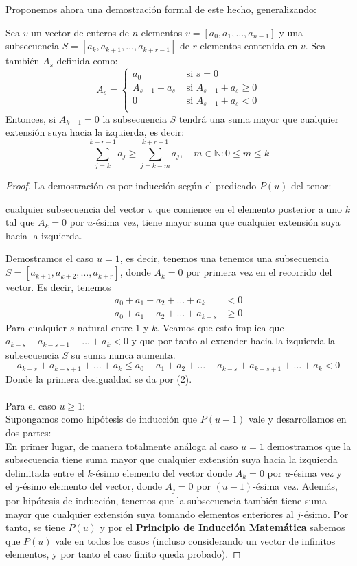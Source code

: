 \documentclass{article}
\begin{document}
Proponemos ahora una demostración formal de este hecho, generalizando:

\begin{teo}
Sea $v$ un vector de enteros de $n$ elementos $v = [a_{0}, a_{1}, \ldots, a_{n-1}]$ y una subsecuencia $S = [a_{k}, a_{k+1}, \ldots, a_{k+r-1}]$ de $r$ elementos contenida en $v$. Sea también $A_{s}$ definida como:
\[
A_{s} = 
\begin{cases}
a_{0} &\text{ si } s = 0 \\
A_{s-1} + a_{s} &\text{ si } A_{s-1} + a_{s} \ge 0 \\
0 &\text{ si } A_{s-1} + a_{s} < 0 \\
\end{cases} 
\]
Entonces, si $A_{k-1} = 0$ la subsecuencia $S$ tendrá una suma mayor que cualquier extensión suya hacia la izquierda, es decir:
\[
\sum_{j=k}^{k+r-1} a_{j} \ge \sum_{j=k-m}^{k+r-1} a_{j}, \quad m \in \mathbb{N} : 0 \le m \le k
\] 

\begin{proof}
La demostración es por inducción según el predicado $P(u)$ del tenor:
\begin{center}
    cualquier subsecuencia del vector $v$ que comience en el elemento
    posterior a uno $k$ tal que $A_k = 0$ por $u$-ésima vez, tiene
    mayor suma que cualquier extensión suya hacia la izquierda.
\end{center}
Demostramos el caso $u = 1$, es decir, tenemos una tenemos una subsecuencia $S = [a_{k+1}, a_{k+2}, \ldots, a_{k+r}]$, donde $A_{k} = 0$ por primera vez en el recorrido del vector.
Es decir, tenemos
\begin{align}
a_{0} + a_{1} + a_{2} + \ldots + a_{k} &< 0 \\
a_{0} + a_{1} + a_{2} + \ldots + a_{k-s} & \geq 0 
\end{align}
Para cualquier $s$ natural entre $1$ y $k$. Veamos que esto
implica que $a_{k-s} + a_{k-s+1} + \ldots + a_{k} < 0$ y que por tanto al extender hacia la izquierda la subsecuencia $S$ su suma 
nunca aumenta.
\[
a_{k-s} + a_{k-s+1} + \ldots + a_{k} \le  a_{0} + a_{1} + a_{2} + \ldots + a_{k-s} + a_{k-s+1} + \ldots + a_{k} < 0
\]
Donde la primera desigualdad se da por (2).
\\
\\
Para el caso $u \geq 1$: \\
\noindent
Supongamos como hipótesis de inducción que $P(u-1)$ vale y desarrollamos en dos partes: 
\\
\noindent
En primer lugar, de manera totalmente análoga al caso $u = 1$ demostramos que
la subsecuencia tiene suma mayor que cualquier extensión suya
hacia la izquierda delimitada entre el $k$-ésimo elemento del vector donde $A_{k} = 0$ por $u$-ésima vez y el $j$-ésimo elemento del vector, donde $A_{j} = 0$ por $(u-1)$-ésima vez. Además, por
hipótesis de inducción, tenemos que la subsecuencia también tiene
suma mayor que cualquier extensión suya tomando elementos enteriores al 
$j$-ésimo. Por tanto, se tiene $P(u)$ y por el \textbf{Principio de Inducción Matemática} sabemos que $P(u)$ vale en todos los casos (incluso considerando un vector de infinitos elementos, y por tanto el caso finito queda probado).
\end{proof}


\end{teo}
\end{document}
